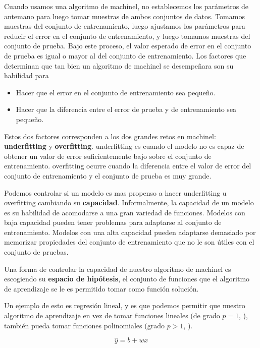 Cuando usamos una algoritmo de \gls{machinel}, no establecemos los parámetros de antemano para luego tomar muestras de ambos conjuntos de datos. Tomamos muestras del conjunto de entrenamiento, luego ajustamos los parámetros para reducir el error en el conjunto de entrenamiento, y luego tomamos muestras del conjunto de prueba. Bajo este proceso, el valor esperado de error en el conjunto de prueba es igual o mayor al del conjunto de entrenamiento. Los factores que determinan que tan bien un algoritmo de \gls{machinel} se desempeñara son su habilidad para
\begin{itemize}
\item Hacer que el error en el conjunto de entrenamiento sea pequeño.
\item Hacer que la diferencia entre el error de prueba y de entrenamiento sea pequeño.
\end{itemize}

Estos dos factores corresponden a los dos grandes retos en \gls{machinel}: \textbf{\gls{underfitting}} y \textbf{\gls{overfitting}}. \gls{underfitting} es cuando el modelo no es capaz de obtener un valor de error suficientemente bajo sobre el conjunto de entrenamiento. \gls{overfitting} ocurre cuando la diferencia entre el valor de error del conjunto de entrenamiento y el conjunto de prueba es muy grande.

Podemos controlar si un modelo es mas propenso a hacer \gls{underfitting} u \gls{overfitting} cambiando su \textbf{capacidad}. Informalmente, la capacidad de un modelo es su habilidad de acomodarse a una gran variedad de funciones. Modelos con baja capacidad pueden tener problemas para adaptarse al conjunto de entrenamiento. Modelos con una alta capacidad pueden adaptarse demasiado por memorizar propiedades del conjunto de entrenamiento que no le son útiles con el conjunto de pruebas.

Una forma de controlar la capacidad de nuestro algoritmo de \gls{machinel} es escogiendo su \textbf{espacio de hipótesis}, el conjunto de funciones que el algoritmo de aprendizaje se le es permitido tomar como función solución.

Un ejemplo de esto es regresión lineal, y es que podemos permitir que nuestro algoritmo de aprendizaje en vez de tomar funciones lineales (de grado $p=1$, ), también pueda tomar funciones polinomiales (grado $p > 1$, ).

\begin{equation} \label{eq:linear-function}
  \hat{y} = b + wx
\end{equation}

